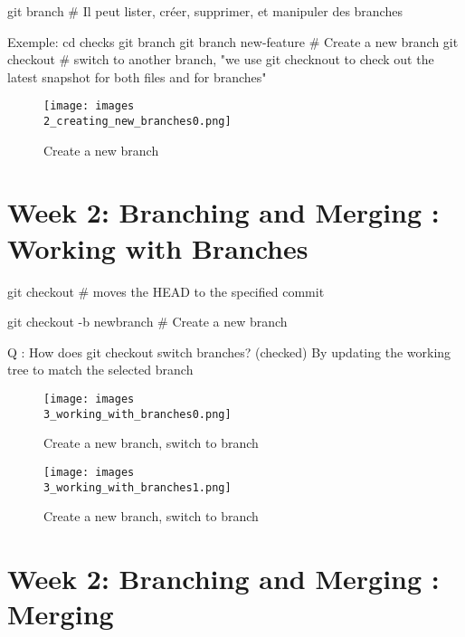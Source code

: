 \documentclass[11pt, onecolumn]{article}
\begin{document}
git branch  # Il peut lister, créer, supprimer, et manipuler des branches

Exemple:
cd checks
git branch
git branch new-feature    # Create a new branch
git checkout   	# switch to another branch, "we use git checknout to check out the latest snapshot for both files and for branches"

\begin{figure}[h]
\begin{center}
\texttt{[image: images\\2\_creating\_new\_branches0.png]}
\end{center}
\caption{Create a new branch}
\label{2_creating_new_branches0}
\end{figure}


\section{Week 2: Branching and Merging : Working with Branches}

git checkout  # moves the HEAD to the specified commit

git checkout -b newbranch    # Create a new branch

Q : How does git checkout switch branches?
(checked) By updating the working tree to match the selected branch

\begin{figure}[h]
\begin{center}
\texttt{[image: images\\3\_working\_with\_branches0.png]}
\end{center}
\caption{Create a new branch, switch to branch}
\label{3_working_with_branches0}
\end{figure}

\begin{figure}[h]
\begin{center}
\texttt{[image: images\\3\_working\_with\_branches1.png]}
\end{center}
\caption{Create a new branch, switch to branch}
\label{tracking_files1}
\end{figure}



\section{Week 2: Branching and Merging : Merging}
\end{document}
